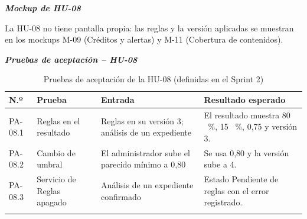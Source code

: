 \par{}\noindent\textbf{\textit{Mockup de HU-08}}\par
La HU-08 no tiene pantalla propia: las reglas y la versión aplicadas se muestran en los mockups M-09 (Créditos y alertas) y M-11 (Cobertura de contenidos).\par\medskip
\par{}\noindent\textbf{\textit{Pruebas de aceptación -- HU-08}}\par

\begin{longtable}{|p{1.4cm}|p{3.7cm}|p{4.6cm}|p{5.1cm}|}
\hline\rowcolor{grisTarjeta}\textbf{N.º} & \textbf{Prueba} & \textbf{Entrada} & \textbf{Resultado esperado}\\\hline
\endhead
PA-08.1 & Reglas en el resultado & Reglas en su versión 3; análisis de un expediente & El resultado muestra 80 ~\%, 15 ~\%, 0,75 y versión 3.\\\hline
PA-08.2 & Cambio de umbral & El administrador sube el parecido mínimo a 0,80 & Se usa 0,80 y la versión sube a 4.\\\hline
PA-08.3 & Servicio de Reglas apagado & Análisis de un expediente confirmado & Estado Pendiente de reglas con el error registrado.\\\hline
\caption{Pruebas de aceptación de la HU-08 (definidas en el Sprint 2)}
\end{longtable}


